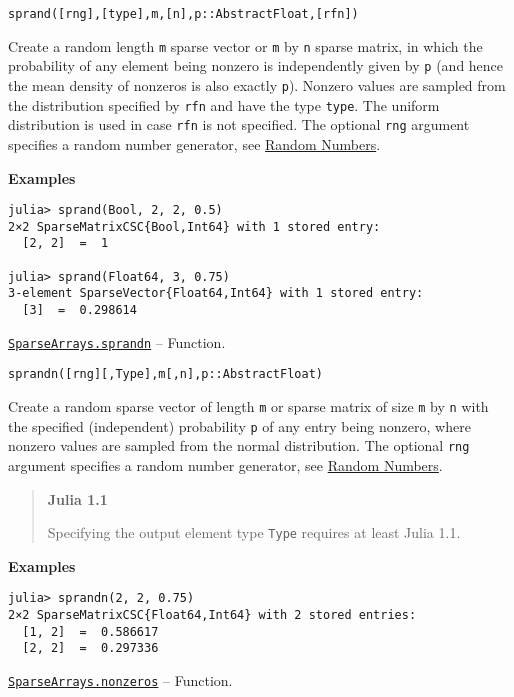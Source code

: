\begin{adjustwidth}{2em}{0pt}


\begin{verbatim}
sprand([rng],[type],m,[n],p::AbstractFloat,[rfn])
\end{verbatim}

Create a random length \texttt{m} sparse vector or \texttt{m} by \texttt{n} sparse matrix, in which the probability of any element being nonzero is independently given by \texttt{p} (and hence the mean density of nonzeros is also exactly \texttt{p}). Nonzero values are sampled from the distribution specified by \texttt{rfn} and have the type \texttt{type}. The uniform distribution is used in case \texttt{rfn} is not specified. The optional \texttt{rng} argument specifies a random number generator, see \hyperlink{16621464973028186601}{Random Numbers}.

\textbf{Examples}


\begin{verbatim}
julia> sprand(Bool, 2, 2, 0.5)
2×2 SparseMatrixCSC{Bool,Int64} with 1 stored entry:
  [2, 2]  =  1

julia> sprand(Float64, 3, 0.75)
3-element SparseVector{Float64,Int64} with 1 stored entry:
  [3]  =  0.298614
\end{verbatim}



\end{adjustwidth}
\hypertarget{3588082437273281277}{} 
\hyperlink{3588082437273281277}{\texttt{SparseArrays.sprandn}}  -- {Function.}

\begin{adjustwidth}{2em}{0pt}


\begin{verbatim}
sprandn([rng][,Type],m[,n],p::AbstractFloat)
\end{verbatim}

Create a random sparse vector of length \texttt{m} or sparse matrix of size \texttt{m} by \texttt{n} with the specified (independent) probability \texttt{p} of any entry being nonzero, where nonzero values are sampled from the normal distribution. The optional \texttt{rng} argument specifies a random number generator, see \hyperlink{16621464973028186601}{Random Numbers}.

\begin{quote}
\textbf{Julia 1.1}

Specifying the output element type \texttt{Type} requires at least Julia 1.1.

\end{quote}
\textbf{Examples}


\begin{verbatim}
julia> sprandn(2, 2, 0.75)
2×2 SparseMatrixCSC{Float64,Int64} with 2 stored entries:
  [1, 2]  =  0.586617
  [2, 2]  =  0.297336
\end{verbatim}



\end{adjustwidth}
\hypertarget{2553509978651134823}{} 
\hyperlink{2553509978651134823}{\texttt{SparseArrays.nonzeros}}  -- {Function.}

